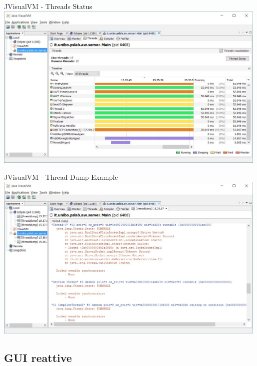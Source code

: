 \documentclass[presentation]{beamer}
\begin{document}
\begin{frame}{JVisualVM - Threads Status}
\centering
\includegraphics[width=0.99\textwidth]{img/jvisualvm-2}
\end{frame}

\begin{frame}{JVisualVM - Thread Dump Example}
\centering
\includegraphics[width=0.99\textwidth]{img/jvisualvm-3}
\end{frame}

\subsection{GUI reattive}
\end{document}
